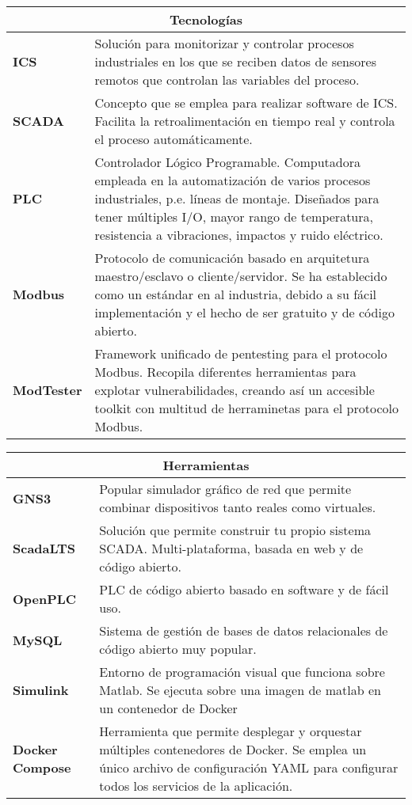\documentclass{article}
\begin{document}
\begin{center}
    \begin{tabular}{|l|m{10cm}|} 
      \hline
      \multicolumn{2}{|c|}{\textbf{Tecnologías}}\\
      \hline
      \textbf{ICS} & Solución para monitorizar y controlar procesos industriales en los que se reciben datos de sensores remotos que controlan las variables del proceso. \\
      \hline
      \textbf{SCADA} & Concepto que se emplea para realizar software de ICS. Facilita la retroalimentación en tiempo real y controla el proceso automáticamente.\\
      \hline
      \textbf{PLC} & Controlador Lógico Programable. Computadora empleada en la automatización de varios procesos industriales, p.e. líneas de montaje. Diseñados para tener múltiples I/O, mayor rango de temperatura, resistencia a vibraciones, impactos y ruido eléctrico. \\
      \hline
      \textbf{Modbus} & Protocolo de comunicación basado en arquitetura maestro/esclavo o cliente/servidor. Se ha establecido como un estándar en al industria, debido a su fácil implementación y el hecho de ser gratuito y de código abierto. \\
      \hline
      \textbf{ModTester} & Framework unificado de pentesting para el protocolo Modbus. Recopila diferentes herramientas para explotar vulnerabilidades, creando así un accesible toolkit con multitud de herraminetas para el protocolo Modbus. \\
      \hline
    \end{tabular}
\end{center}

\begin{center}
    \begin{tabular}{|l|m{10cm}|} 
      \hline
      \multicolumn{2}{|c|}{\textbf{Herramientas}}\\
      \hline
      \textbf{GNS3} & Popular simulador gráfico de red que permite combinar dispositivos tanto reales como virtuales. \\
      \hline
      \textbf{ScadaLTS} & Solución que permite construir tu propio sistema SCADA. Multi-plataforma, basada en web y de código abierto.\\
      \hline
      \textbf{OpenPLC} & PLC de código abierto basado en software y de fácil uso. \\
      \hline
      \textbf{MySQL} & Sistema de gestión de bases de datos relacionales de código abierto muy popular. \\
      \hline
      \textbf{Simulink} & Entorno de programación visual que funciona sobre Matlab. Se ejecuta sobre una imagen de matlab en un contenedor de Docker\\
      \hline     
      \textbf{Docker Compose} & Herramienta que permite desplegar y orquestar múltiples contenedores de Docker. Se emplea un único archivo de configuración YAML para configurar todos los servicios de la aplicación. \\
      \hline     
    \end{tabular}
\end{center}

\clearpage


\end{document}
